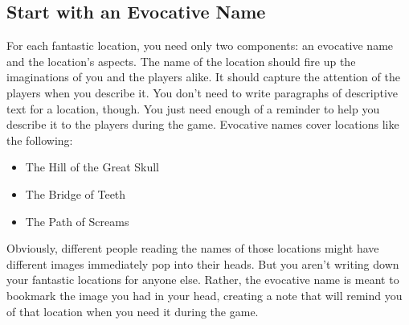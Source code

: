 \documentclass[10pt,a4paper,twoside,bg=print,twocolumn,openany,nodeprecatedcode]{dndbook}
\begin{document}
\subsection{Start with an Evocative Name}
For each fantastic location, you need only two components: an evocative name and the location's aspects. The name of the location should fire up the imaginations of you and the players alike. It should capture the attention of the players when you describe it. You don't need to write paragraphs of descriptive text for a location, though. You just need enough of a reminder to help you describe it to the players during the game.
Evocative names cover locations like the following:

\begin{itemize}
\item The Hill of the Great Skull
\item The Bridge of Teeth
\item The Path of Screams
\end{itemize}

Obviously, different people reading the names of those locations might have different images immediately pop into their heads. But you aren't writing down your fantastic locations for anyone else. Rather, the evocative name is meant to bookmark the image you had in your head, creating a note that will remind you of that location when you need it during the game.
\end{document}
